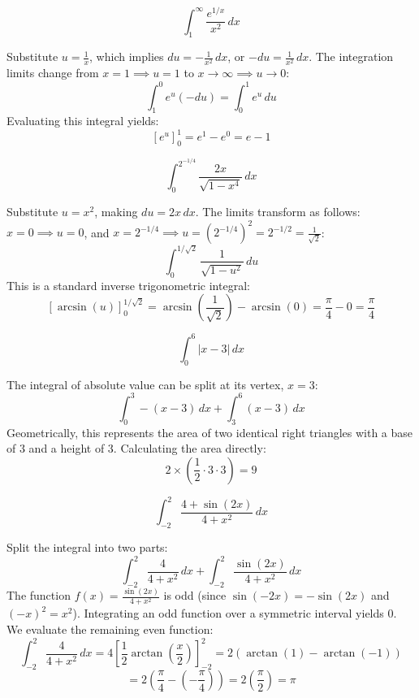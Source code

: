 \begin{questions}
    \question \[ \int_{1}^{\infty}\frac{e^{1/x}}{x^{2}} \,dx \]
    \begin{solution}
        Substitute $u = \frac{1}{x}$, which implies $du = -\frac{1}{x^2} \,dx$, or $-du = \frac{1}{x^2} \,dx$.
        The integration limits change from $x = 1 \implies u = 1$ to $x \to \infty \implies u \to 0$:
        \[ \int_{1}^{0} e^u (-du) = \int_{0}^{1} e^u \,du \]
        Evaluating this integral yields:
        \[ \left[ e^u \right]_0^1 = e^1 - e^0 = e - 1 \]
    \end{solution}

    \question \[ \int_{0}^{2^{-1/4}}\frac{2x}{\sqrt{1-x^{4}}} \,dx \]
    \begin{solution}
        Substitute $u = x^2$, making $du = 2x \,dx$. The limits transform as follows: $x = 0 \implies u = 0$, and $x = 2^{-1/4} \implies u = (2^{-1/4})^2 = 2^{-1/2} = \frac{1}{\sqrt{2}}$:
        \[ \int_{0}^{1/\sqrt{2}} \frac{1}{\sqrt{1-u^2}} \,du \]
        This is a standard inverse trigonometric integral:
        \[ \left[ \arcsin(u) \right]_0^{1/\sqrt{2}} = \arcsin\left(\frac{1}{\sqrt{2}}\right) - \arcsin(0) = \frac{\pi}{4} - 0 = \frac{\pi}{4} \]
    \end{solution}

    \question \[ \int_{0}^{6}|x-3| \,dx \]
    \begin{solution}
        The integral of absolute value can be split at its vertex, $x = 3$:
        \[ \int_{0}^{3} -(x-3) \,dx + \int_{3}^{6} (x-3) \,dx \]
        Geometrically, this represents the area of two identical right triangles with a base of $3$ and a height of $3$. Calculating the area directly:
        \[ 2 \times \left( \frac{1}{2} \cdot 3 \cdot 3 \right) = 9 \]
    \end{solution}

    \question \[ \int_{-2}^{2}\frac{4+\sin(2x)}{4+x^{2}} \,dx \]
    \begin{solution}
        Split the integral into two parts:
        \[ \int_{-2}^{2} \frac{4}{4+x^2} \,dx + \int_{-2}^{2} \frac{\sin(2x)}{4+x^2} \,dx \]
        The function $f(x) = \frac{\sin(2x)}{4+x^2}$ is odd (since $\sin(-2x) = -\sin(2x)$ and $(-x)^2 = x^2$). Integrating an odd function over a symmetric interval yields $0$.
        We evaluate the remaining even function:
        \[ \int_{-2}^{2} \frac{4}{4+x^2} \,dx = 4 \left[ \frac{1}{2}\arctan\left(\frac{x}{2}\right) \right]_{-2}^2 = 2 \left( \arctan(1) - \arctan(-1) \right) \]
        \[ = 2 \left( \frac{\pi}{4} - \left(-\frac{\pi}{4}\right) \right) = 2 \left( \frac{\pi}{2} \right) = \pi \]
    \end{solution}


\end{questions}
